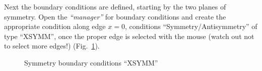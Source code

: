 \documentclass[english,a4paper,12pt]{article}
\begin{document}
Next the boundary conditions are defined, starting by the two planes of symmetry.
Open the \emph{``manager''} for boundary conditions and create the appropriate condition along edge $x=0$, conditions ``Symmetry/Antisymmetry'' of type ``XSYMM'', once the proper edge is selected with the mouse (watch out not to select more edges!) (Fig.~\ref{fig:xsymm}).
\begin{figure}[h!tp]
\centering
{}
\caption{Symmetry boundary conditions ``XSYMM''}
\label{fig:xsymm}
\end{figure}
\end{document}
